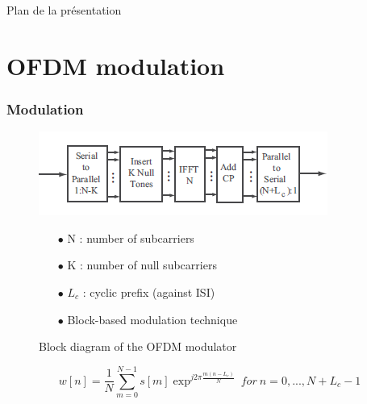 \documentclass[11pt]{beamer}
\begin{document}
{
	\begin{frame}[noframenumbering]{Plan de la présentation}
		\tableofcontents
	\end{frame}
}

\section{OFDM modulation}
\begin{frame}
\frametitle{Modulation}

\begin{figure}[!ht]
    \begin{minipage}[b]{0.48\linewidth}
        \centering \includegraphics[scale=0.6]{img/OFDDM_modulator.png}
     \caption{Block diagram of the OFDM modulator}
     \label{fig2}
    \end{minipage}\hfill
    \begin{minipage}[b]{0.48\linewidth}  
    \centering  
    \begin{itemize}
    \item[$\bullet$] N : number of subcarriers
    \item[$\bullet$] K : number of null subcarriers
    \item[$\bullet$] $L_c$ : cyclic prefix (against ISI)
    \item[$\bullet$] Block-based modulation technique
    \end{itemize}
        
    \end{minipage}
\end{figure}
\begin{equation}
w[n]=\frac{1}{N} \sum_{m=0}^{N-1} s[m]\exp^{j2\pi\frac{m(n-L_c)}{N}}~for~n=0,...,N+L_c-1
\end{equation}
\end{frame}
\end{document}
